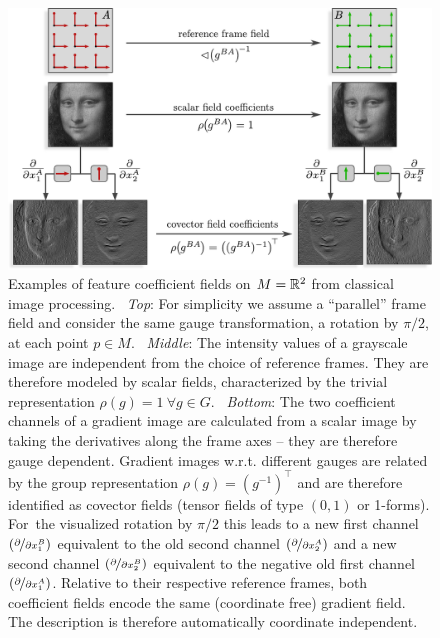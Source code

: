 \begin{figure}
    \centering
    \includegraphics[width=.83\columnwidth]{figures/mona_lisa_gradient.pdf}
    \caption{\small
        Examples of feature coefficient fields on $M=\mathbb{R}^2$ from classical image processing.
        \ \emph{Top}:
        For simplicity we assume a ``parallel'' frame field and consider the same gauge transformation, a rotation by $\pi/2$, at each point $p\in M$.
        \ \emph{Middle}:
        The intensity values of a grayscale image are independent from the choice of reference frames.
        They are therefore modeled by scalar fields, characterized by the trivial representation $\rho(g)=1\ \forall g\in G$.
        \ \emph{Bottom}:
        The two coefficient channels of a gradient image are calculated from a scalar image by taking the derivatives along the frame axes -- they are therefore gauge dependent.
        Gradient images w.r.t. different gauges are related by the group representation $\rho(g)=(g^{-1})^\top$ and are therefore identified as covector fields (tensor fields of type $(0,1)$ or 1-forms).
        For~the visualized rotation by $\pi/2$ this leads to a new first channel $(\nicefrac{\partial}{\partial x_1^B})$ equivalent to the old second channel $(\nicefrac{\partial}{\partial x_2^A})$ and a new second channel $(\nicefrac{\partial}{\partial x_2^B})$ equivalent to the negative old first channel $(\nicefrac{\partial}{\partial x_1^A})$.
        Relative to their respective reference frames, both coefficient fields encode the same (coordinate free) gradient field.
        The description is therefore automatically coordinate independent.
    }
    \label{fig:feature_field_gradient}
\end{figure}

